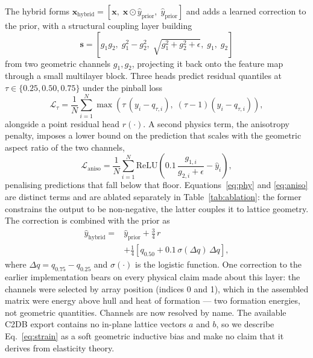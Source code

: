 \documentclass{ieeeaccess}
\begin{document}
The hybrid forms $\mathbf{x}_{\mathrm{hybrid}} = [\mathbf{x},\; \mathbf{x}\odot\hat{y}_{\mathrm{prior}},\; \hat{y}_{\mathrm{prior}}]$ and adds a learned correction to the prior, with a structural coupling layer building
\begin{equation}
\mathbf{s} = \left[g_1 g_2,\; g_1^2-g_2^2,\; \sqrt{g_1^2+g_2^2+\epsilon},\; g_1,\; g_2\right]
\label{eq:strain}
\end{equation}
from two geometric channels $g_1, g_2$, projecting it back onto the feature map through a small multilayer block. Three heads predict residual quantiles at $\tau \in \{0.25, 0.50, 0.75\}$ under the pinball loss \cite{koenker1978regression}
\begin{equation}
\mathcal{L}_\tau = \frac{1}{N}\sum_{i=1}^{N}
  \max\!\left(\tau\,(y_i - q_{\tau,i}),\; (\tau-1)(y_i - q_{\tau,i})\right),
\label{eq:pinball}
\end{equation}
alongside a point residual head $r(\cdot)$. A second physics term, the anisotropy penalty, imposes a lower bound on the prediction that scales with the geometric aspect ratio of the two channels,
\begin{equation}
\mathcal{L}_{\mathrm{aniso}} = \frac{1}{N}\sum_{i=1}^{N}
  \mathrm{ReLU}\!\left(0.1\,\frac{g_{1,i}}{g_{2,i}+\epsilon} - \hat{y}_i\right),
\label{eq:aniso}
\end{equation}
penalising predictions that fall below that floor. Equations~\eqref{eq:phy} and \eqref{eq:aniso} are distinct terms and are ablated separately in Table~\ref{tab:ablation}: the former constrains the output to be non-negative, the latter couples it to lattice geometry. The correction is combined with the prior as
\begin{equation}
\begin{split}
\hat{y}_{\mathrm{hybrid}} = {}& \hat{y}_{\mathrm{prior}} + \tfrac{3}{4}\, r \\
  &+ \tfrac{1}{4}\left[q_{0.50} + 0.1\,\sigma(\Delta q)\,\Delta q\right],
\end{split}
\label{eq:hybrid}
\end{equation}
where $\Delta q = q_{0.75}-q_{0.25}$ and $\sigma(\cdot)$ is the logistic function. One correction to the earlier implementation bears on every physical claim made about this layer: the channels were selected by array position (indices 0 and 1), which in the assembled matrix were energy above hull and heat of formation --- two formation energies, not geometric quantities. Channels are now resolved by name. The available C2DB export contains no in-plane lattice vectors $a$ and $b$, so we describe Eq.~\eqref{eq:strain} as a soft geometric inductive bias and make no claim that it derives from elasticity theory.
\end{document}
